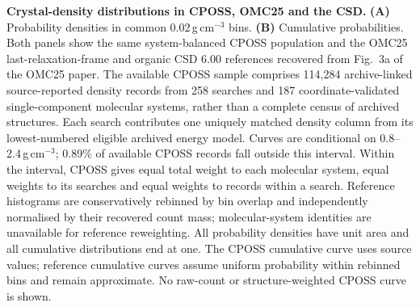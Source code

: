 \caption{\textbf{Crystal-density distributions in CPOSS, OMC25 and the CSD.} \textbf{(A)} Probability densities in common 0.02\,g\,cm$^{-3}$ bins. \textbf{(B)} Cumulative probabilities. Both panels show the same system-balanced CPOSS population and the OMC25 last-relaxation-frame and organic CSD 6.00 references recovered from Fig.~3a of the OMC25 paper\cite{gharakhanyan2026omc25}. The available CPOSS sample comprises 114,284 archive-linked source-reported density records from 258 searches and 187 coordinate-validated single-component molecular systems, rather than a complete census of archived structures. Each search contributes one uniquely matched density column from its lowest-numbered eligible archived energy model. Curves are conditional on 0.8--2.4\,g\,cm$^{-3}$; 0.89\% of available CPOSS records fall outside this interval. Within the interval, CPOSS gives equal total weight to each molecular system, equal weights to its searches and equal weights to records within a search. Reference histograms are conservatively rebinned by bin overlap and independently normalised by their recovered count mass; molecular-system identities are unavailable for reference reweighting. All probability densities have unit area and all cumulative distributions end at one. The CPOSS cumulative curve uses source values; reference cumulative curves assume uniform probability within rebinned bins and remain approximate. No raw-count or structure-weighted CPOSS curve is shown.}
\label{fig:cposs_omc25_csd_density}
